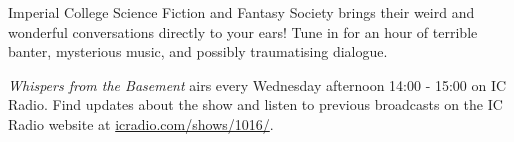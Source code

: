 Imperial College Science Fiction and Fantasy Society brings their weird and wonderful conversations directly to your ears! Tune in for an hour of terrible banter, mysterious music, and possibly traumatising dialogue.

\textit{Whispers from the Basement} airs every Wednesday afternoon 14:00 - 15:00 on IC Radio. Find updates about the show and listen to previous broadcasts on the IC Radio website at \url{icradio.com/shows/1016/}.
